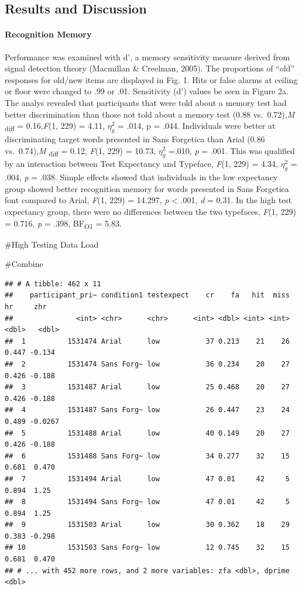 \documentclass[
  english,
  jou]{apa6}
\let\oldparagraph\paragraph
\renewcommand{\paragraph}[1]{\oldparagraph{#1}\mbox{}}
\begin{document}
\hypertarget{results-and-discussion}{%
\subsection{Results and Discussion}\label{results-and-discussion}}

\hypertarget{recognition-memory}{%
\paragraph{Recognition Memory}\label{recognition-memory}}

Performance was examined with d', a memory sensitivity measure derived from signal detection theory (Macmillan \& Creelman, 2005). The proportions of \enquote{old} responses for old/new items are displayed in Fig. 1. Hits or false alarms at ceiling or floor were changed to .99 or .01. Sensitivity (d') values be seen in Figure 2a. The analys revealed that participants that were told about a memory test had better discrimination than those not told about a memory test (0.88 vs.~0.72),\emph{M} \textsubscript{diff} = 0.16,\emph{F}(1, 229) = 4.11, \(\eta_{g}^{2}\) = .014, p = .044. Individuals were better at discriminating target words presented in Sans Forgetica than Arial (0.86 vs.~0.74),\emph{M} \textsubscript{diff} = 0.12, \emph{F}(1, 229) = 10.73, \(\eta_{g}^{2}\) =.010, \emph{p} = .001. This was qualified by an interaction between Test Expectancy and Typeface, \emph{F}(1, 229) = 4.34, \(\eta_{g}^{2}\) = .004, \emph{p} = .038. Simple effects showed that individuals in the low expectancy group showed better recognition memory for words presented in Sans Forgetica font compared to Arial, \emph{F}(1, 229) = 14.297, \emph{p} \textless{} .001, \emph{d} = 0.31. In the high test expectancy group, there were no differences between the two typefaces, \emph{F}(1, 229) = 0.716, \emph{p} = .398, BF\textsubscript{O1} = 5.83.

\#High Testing Data Load

\#Combine

\begin{verbatim}
## # A tibble: 462 x 11
##    participant_pri~ condition1 testexpect    cr    fa   hit  miss    hr     zhr
##               <int> <chr>      <chr>      <int> <dbl> <int> <int> <dbl>   <dbl>
##  1          1531474 Arial      low           37 0.213    21    26 0.447 -0.134 
##  2          1531474 Sans Forg~ low           36 0.234    20    27 0.426 -0.188 
##  3          1531487 Arial      low           25 0.468    20    27 0.426 -0.188 
##  4          1531487 Sans Forg~ low           26 0.447    23    24 0.489 -0.0267
##  5          1531488 Arial      low           40 0.149    20    27 0.426 -0.188 
##  6          1531488 Sans Forg~ low           34 0.277    32    15 0.681  0.470 
##  7          1531494 Arial      low           47 0.01     42     5 0.894  1.25  
##  8          1531494 Sans Forg~ low           47 0.01     42     5 0.894  1.25  
##  9          1531503 Arial      low           30 0.362    18    29 0.383 -0.298 
## 10          1531503 Sans Forg~ low           12 0.745    32    15 0.681  0.470 
## # ... with 452 more rows, and 2 more variables: zfa <dbl>, dprime <dbl>
\end{verbatim}
\end{document}
